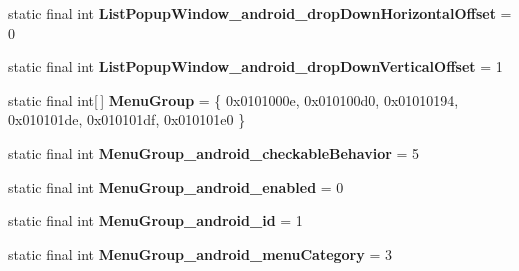 \begin{DoxyCompactItemize}
\item 
\hypertarget{classandroid_1_1support_1_1design_1_1_r_1_1styleable_a5cbe1721ac6cfb1ee789c9bf9756625f}{}static final int {\bfseries List\+Popup\+Window\+\_\+android\+\_\+drop\+Down\+Horizontal\+Offset} = 0\label{classandroid_1_1support_1_1design_1_1_r_1_1styleable_a5cbe1721ac6cfb1ee789c9bf9756625f}

\item 
\hypertarget{classandroid_1_1support_1_1design_1_1_r_1_1styleable_a1530f5817ae4dc538e7282df67a530a0}{}static final int {\bfseries List\+Popup\+Window\+\_\+android\+\_\+drop\+Down\+Vertical\+Offset} = 1\label{classandroid_1_1support_1_1design_1_1_r_1_1styleable_a1530f5817ae4dc538e7282df67a530a0}

\item 
\hypertarget{classandroid_1_1support_1_1design_1_1_r_1_1styleable_a39805bd4a947832cbac3bd5f30eef344}{}static final int\mbox{[}$\,$\mbox{]} {\bfseries Menu\+Group} = \{ 0x0101000e, 0x010100d0, 0x01010194, 0x010101de, 0x010101df, 0x010101e0 \}\label{classandroid_1_1support_1_1design_1_1_r_1_1styleable_a39805bd4a947832cbac3bd5f30eef344}

\item 
\hypertarget{classandroid_1_1support_1_1design_1_1_r_1_1styleable_a6a6b6fb9de4775a9eea3bdded6d73190}{}static final int {\bfseries Menu\+Group\+\_\+android\+\_\+checkable\+Behavior} = 5\label{classandroid_1_1support_1_1design_1_1_r_1_1styleable_a6a6b6fb9de4775a9eea3bdded6d73190}

\item 
\hypertarget{classandroid_1_1support_1_1design_1_1_r_1_1styleable_a1c4886b1aa7830d5f7de3e80324abcab}{}static final int {\bfseries Menu\+Group\+\_\+android\+\_\+enabled} = 0\label{classandroid_1_1support_1_1design_1_1_r_1_1styleable_a1c4886b1aa7830d5f7de3e80324abcab}

\item 
\hypertarget{classandroid_1_1support_1_1design_1_1_r_1_1styleable_a150a7837cc130e393e2d497a2df1d310}{}static final int {\bfseries Menu\+Group\+\_\+android\+\_\+id} = 1\label{classandroid_1_1support_1_1design_1_1_r_1_1styleable_a150a7837cc130e393e2d497a2df1d310}

\item 
\hypertarget{classandroid_1_1support_1_1design_1_1_r_1_1styleable_a650e6468d9a014506f9e2b1ca9185cbb}{}static final int {\bfseries Menu\+Group\+\_\+android\+\_\+menu\+Category} = 3\label{classandroid_1_1support_1_1design_1_1_r_1_1styleable_a650e6468d9a014506f9e2b1ca9185cbb}


\end{DoxyCompactItemize}
